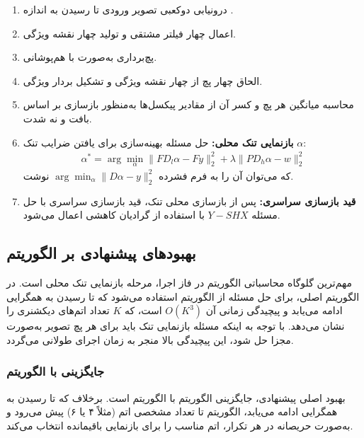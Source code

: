 \begin{enumerate}
\item درونیابی دوکعبی تصویر ورودی تا رسیدن به اندازه .
\item اعمال چهار فیلتر مشتقی و تولید چهار نقشه ویژگی.
\item پچ‌برداری به‌صورت  با هم‌پوشانی.
\item الحاق چهار پچ از چهار نقشه ویژگی و تشکیل بردار ویژگی.
\item محاسبه میانگین هر پچ و کسر آن از مقادیر پیکسل‌ها به‌منظور بازسازی بر اساس بافت و نه شدت.
\item \textbf{بازنمایی تنک محلی:} حل مسئله بهینه‌سازی برای یافتن ضرایب تنک $\alpha$:
\begin{align}
\alpha^* = \arg\min_{\alpha} \|F D_l \alpha - F y\|_2^2 + \lambda \|P D_h \alpha - w\|_2^2
\end{align}
که می‌توان آن را به فرم فشرده $\arg\min_{\alpha} \|D\alpha - y\|_2^2$ نوشت.
\item \textbf{قید بازسازی سراسری:} پس از بازسازی محلی تنک، قید بازسازی سراسری با حل مسئله $Y - SHX$ با استفاده از گرادیان کاهشی اعمال می‌شود.
\end{enumerate}

\subsection{بهبودهای پیشنهادی بر الگوریتم }
\label{subsec:scsr_proposed}

مهم‌ترین گلوگاه محاسباتی الگوریتم  در فاز اجرا، مرحله بازنمایی تنک محلی است. در الگوریتم اصلی، برای حل مسئله  از الگوریتم  استفاده می‌شود که تا رسیدن به همگرایی ادامه می‌یابد و پیچیدگی زمانی آن $O(K^3)$ است، که $K$ تعداد اتم‌های دیکشنری را نشان می‌دهد. با توجه به اینکه مسئله بازنمایی تنک باید برای هر پچ تصویر به‌صورت مجزا حل شود، این پیچیدگی بالا منجر به زمان اجرای طولانی می‌گردد.

\subsubsection{جایگزینی با الگوریتم }

بهبود اصلی پیشنهادی، جایگزینی الگوریتم  با الگوریتم  است. برخلاف  که تا رسیدن به همگرایی ادامه می‌یابد، الگوریتم  تا تعداد مشخصی اتم (مثلاً ۴ یا ۶) پیش می‌رود و به‌صورت حریصانه در هر تکرار، اتم مناسب‌ را برای بازنمایی باقیمانده انتخاب می‌کند.

